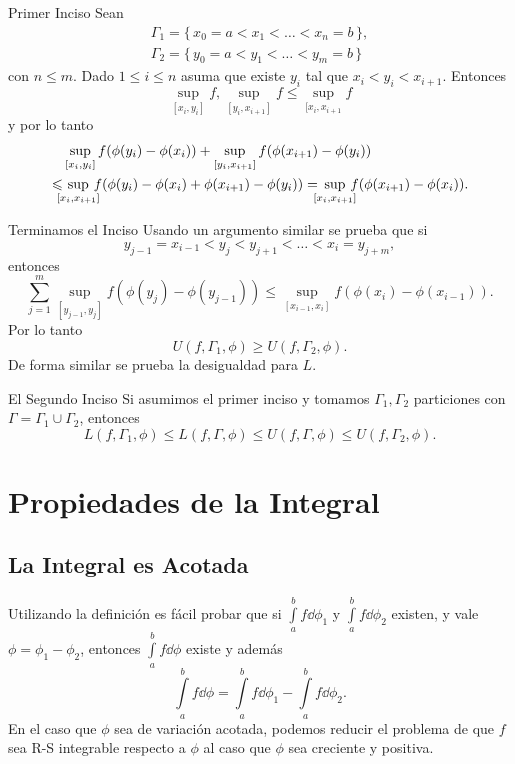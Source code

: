 \documentclass[utf8]{beamer}
\theoremstyle{plain}
\theoremstyle{definition}
\theoremstyle{remark}
\numberwithin{equation}{section}
\newcommand{\Ga}{\Gamma}                %
\newcommand{\set}[1]{\{\,#1\,\}}    %
\renewcommand{\geq}{\geqslant}          %
\renewcommand{\leq}{\leqslant}          %
\renewcommand{\.}{\Cdot}                %
\begin{document}
 \begin{frame}{Primer Inciso}
   Sean 
   \begin{gather*}
    \Ga_1=\set{x_0=a<x_1<\dots<x_n=b},\\
    \Ga_2=\set{y_0=a<y_1<\dots<y_m=b}
   \end{gather*}
   con $n\leq m$. Dado $1\leq i\leq n$ asuma que existe $y_i$ tal que $x_i<y_i<x_{i+1}$. Entonces
   $$\sup_{[x_i,y_i]}f,\sup_{[y_i,x_{i+1}]}f\leq \sup_{[x_i,x_{i+1}}f$$
   y por lo tanto
   \begin{align*}
    &\sup_{[x_i,y_i]}f(\phi(y_i)-\phi(x_i))+\sup_{[y_i,x_{i+1}]}f(\phi(x_{i+1})-\phi(y_i))\\
    \leq&\hspace{-6pt}\sup_{[x_i,x_{i+1}]}\hspace{-6pt}f(\phi(y_i)-\phi(x_i)+\phi(x_{i+1})-\phi(y_i))
    =\hspace{-6pt}\sup_{[x_i,x_{i+1}]}\hspace{-6pt}f(\phi(x_{i+1})-\phi(x_i)).
   \end{align*}
 \end{frame}

 \begin{frame}{Terminamos el Inciso}
   Usando un argumento similar se prueba que si 
   $$y_{j-1}=x_{i-1}<y_j<y_{j+1}<\dots<x_i=y_{j+m},$$
   entonces
   $$\sum_{j=1}^m\sup_{[y_{j-1},y_j]}f(\phi(y_j)-\phi(y_{j-1}))\leq\sup_{[x_{i-1},x_i]}f(\phi(x_{i})-\phi(x_{i-1})).$$
   Por lo tanto 
   $$U(f,\Ga_1,\phi)\geq U(f,\Ga_2,\phi).$$
   De forma similar se prueba la desigualdad para $L$.
 \end{frame}

 \begin{frame}{El Segundo Inciso}
Si asumimos el primer inciso y tomamos $\Ga_1,\Ga_2$ particiones con $\Ga=\Ga_1\cup \Ga_2$, entonces
$$L(f,\Ga_1,\phi)\leq L(f,\Ga,\phi)\leq U(f,\Ga,\phi)\leq U(f,\Ga_2,\phi).$$ 
 \end{frame}

 \section{Propiedades de la Integral}

 \subsection{La Integral es Acotada}
 \begin{frame}
   Utilizando la definición es fácil probar que si $\int\limits_a^bf\dd\phi_1$ y $\int\limits_a^bf\dd\phi_2$ existen, y vale $\phi=\phi_1-\phi_2$, entonces $\int\limits_a^bf\dd\phi$ existe y además 
   $$\int\limits_a^bf\dd\phi=\int\limits_a^bf\dd\phi_1-\int\limits_a^bf\dd\phi_2.$$
   En el caso que $\phi$ sea de variación acotada, podemos reducir el problema de que $f$ sea R-S integrable respecto a $\phi$ al caso que $\phi$ sea creciente y positiva.
 \end{frame}
\end{document}
